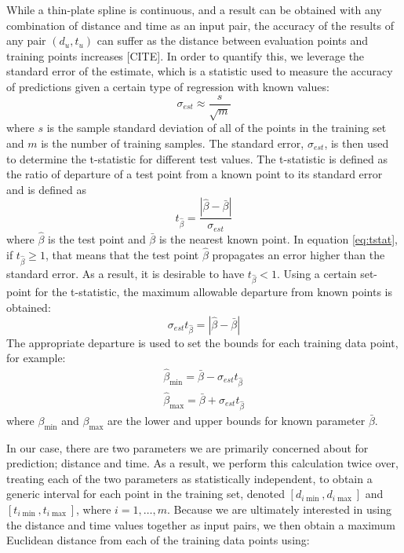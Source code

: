 \documentclass[letterpaper, 10 pt, conference]{ieeeconf}  %
\begin{document}
While a thin-plate spline is continuous, and a result can be obtained with any combination of distance and time as an input pair, the accuracy of the results of any pair $(d_u,t_u)$ can suffer as the distance between evaluation points and training points increases [CITE]. In order to quantify this, we leverage the standard error of the estimate, which is a statistic used to measure the accuracy of predictions given a certain type of regression with known values:
\begin{equation} \label{eq:stderr}
    \sigma_{est} \approx \frac{s}{\sqrt{m}}
\end{equation}
where $s$ is the sample standard deviation of all of the points in the training set and $m$ is the number of training samples. The standard error, $\sigma_{est}$, is then used to determine the t-statistic for different test values. The t-statistic is defined as the ratio of departure of a test point from a known point to its standard error and is defined as
\begin{equation} \label{eq:tstat}
t_{\hat{\beta}} = \frac{|\hat{\beta}-\bar{\beta}|}{\sigma_{est}}    
\end{equation}
where $\hat{\beta}$ is the test point and $\bar{\beta}$ is the nearest known point. In equation \eqref{eq:tstat}, if $t_{\hat{\beta}} \geq 1$, that means that the test point $\hat{\beta}$ propagates an error higher than the standard error. As a result, it is desirable to have $t_{\hat{\beta}} < 1$. Using a certain set-point for the t-statistic, the maximum allowable departure from known points is obtained:
\begin{equation}
    \sigma_{est}t_{\hat{\beta}} = |\hat{\beta}-\bar{\beta}|
\end{equation}
The appropriate departure is used to set the bounds for each training data point, for example:
\begin{align}
    \hat{\beta}_{\min} = \bar{\beta} - \sigma_{est}t_{\hat{\beta}} \nonumber \\
    \hat{\beta}_{\max} = \bar{\beta} + \sigma_{est}t_{\hat{\beta}}
\end{align}
where $\beta_{\min}$ and $\beta_{\max}$ are the lower and upper bounds for known parameter $\bar{\beta}$.

In our case, there are two parameters we are primarily concerned about for prediction; distance and time. As a result, we perform this calculation twice over, treating each of the two parameters as statistically independent, to obtain a generic interval for each point in the training set, denoted $[d_{i\min},d_{i\max}]$ and $[t_{i\min},t_{i\max}]$, where $i=1,\ldots,m$. Because we are ultimately interested in using the distance and time values together as input pairs, we then obtain a maximum Euclidean distance from each of the training data points using:
\end{document}
